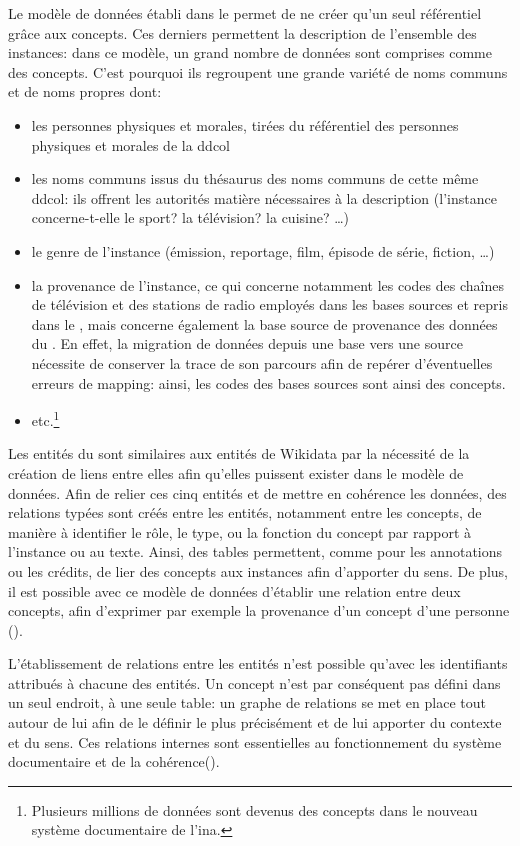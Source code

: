 Le modèle de données établi dans le \ldd permet de ne créer qu'un seul \og référentiel\fg{} grâce aux concepts. Ces derniers permettent la description de l'ensemble des instances: dans ce modèle, un grand nombre de données sont comprises comme des concepts. C'est pourquoi ils regroupent une grande variété de noms communs et de noms propres dont:
\begin{itemize}
	\item les personnes physiques et morales, tirées du référentiel des personnes physiques et morales de la \ac{ddcol}
	\item les noms communs issus du thésaurus des noms communs de cette même \ac{ddcol}: ils offrent les autorités matière nécessaires à la description (l'instance concerne-t-elle le sport? la télévision? la cuisine? \dots)
	\item  le genre de l'instance (émission, reportage, film, épisode de série, fiction, \dots)
	\item la provenance de l'instance, ce qui concerne notamment les codes des chaînes de télévision et des stations de radio employés dans les bases sources et repris dans le \ldd, mais concerne également la base source de provenance des données du \ldd. En effet, la migration de données depuis une base vers une source nécessite de conserver la trace de son parcours afin de repérer d'éventuelles erreurs de mapping: ainsi, les codes des bases sources sont ainsi des concepts.
	\item etc.\footnote{Plusieurs millions de données sont devenus des concepts dans le nouveau système documentaire de l'\ac{ina}.}
\end{itemize}
\medskip

Les entités du \ldd sont similaires aux entités de Wikidata par la nécessité de la création de liens entre elles afin qu'elles puissent exister dans le modèle de données. Afin de relier ces cinq entités et de mettre en cohérence les données, des relations typées sont créés entre les entités, notamment entre les concepts, de manière à identifier le rôle, le type, ou la fonction du concept par rapport à l'instance ou au texte. Ainsi, des tables permettent, comme pour les annotations ou les crédits, de lier des concepts aux instances afin d'apporter du sens. De plus, il est possible avec ce modèle de données d'établir une relation entre deux concepts, afin d'exprimer par exemple la provenance d'un concept d'une personne (). 


L'établissement de relations entre les entités n'est possible qu'avec les identifiants attribués à chacune des entités. Un concept n'est par conséquent pas défini dans un seul endroit, à une seule table: un graphe de relations se met en place tout autour de lui afin de le définir le plus précisément et de lui apporter du contexte et du sens. Ces relations internes sont essentielles au fonctionnement du système documentaire et de la cohérence().


